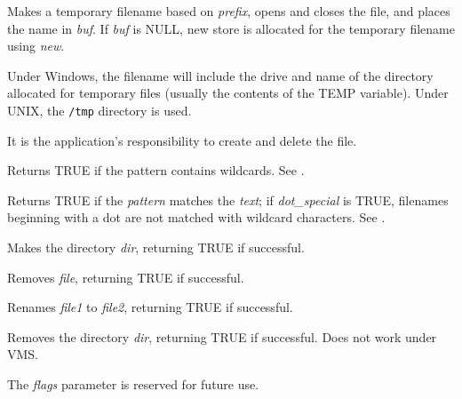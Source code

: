 Makes a temporary filename based on {\it prefix}, opens and closes the file,
and places the name in {\it buf}. If {\it buf} is NULL, new store
is allocated for the temporary filename using {\it new}.

Under Windows, the filename will include the drive and name of the
directory allocated for temporary files (usually the contents of the
TEMP variable). Under UNIX, the {\tt /tmp} directory is used.

It is the application's responsibility to create and delete the file.

\label{wxiswild}


Returns TRUE if the pattern contains wildcards. See .

\label{wxmatchwild}


Returns TRUE if the {\it pattern}\/ matches the {\it text}\/; if {\it
dot\_special}\/ is TRUE, filenames beginning with a dot are not matched
with wildcard characters. See .



Makes the directory {\it dir}, returning TRUE if successful.



Removes {\it file}, returning TRUE if successful.



Renames {\it file1} to {\it file2}, returning TRUE if successful.



Removes the directory {\it dir}, returning TRUE if successful. Does not work under VMS.

The {\it flags} parameter is reserved for future use.


